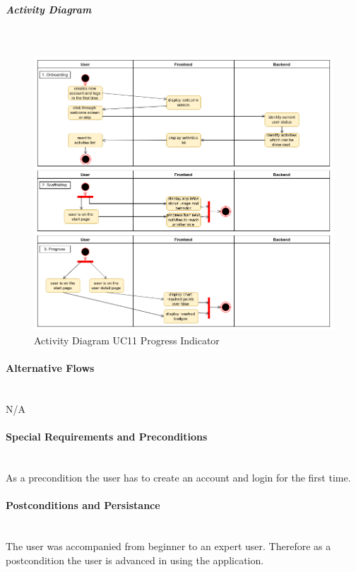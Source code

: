 \subparagraph{Activity Diagram}\mbox{}\\
\begin{figure}[H]
	\centering
	\includegraphics[width=1.0\textwidth]{Content/Domain/UC11ProgressIndicator.png}
	\caption{Activity Diagram  \ac{UC}11 Progress Indicator}
	\label{fig:label12}
\end{figure}

\paragraph*{Alternative Flows}\mbox{}\\
N/A

\paragraph*{Special Requirements and Preconditions}\mbox{}\\
As a precondition the user has to create an account and login for the first time. 

\paragraph*{Postconditions and Persistance}\mbox{}\\
The user was accompanied from beginner to an expert user. Therefore as a postcondition the user is advanced in using the application.

\newpage